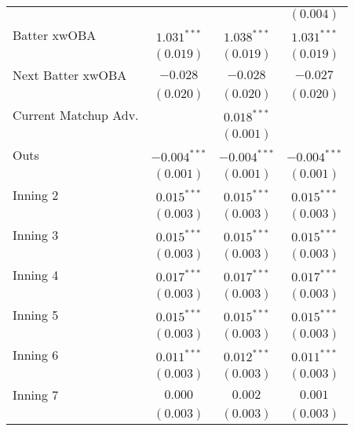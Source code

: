 \begin{table}
\begin{center}
\begin{tabular}{l c c c}
                               &                &                & $(0.004)$        \\
Batter xwOBA                   & $1.031^{***}$  & $1.038^{***}$  & $1.031^{***}$    \\
                               & $(0.019)$      & $(0.019)$      & $(0.019)$        \\
Next Batter xwOBA              & $-0.028$       & $-0.028$       & $-0.027$         \\
                               & $(0.020)$      & $(0.020)$      & $(0.020)$        \\
Current Matchup Adv.           &                & $0.018^{***}$  &                  \\
                               &                & $(0.001)$      &                  \\
Outs                           & $-0.004^{***}$ & $-0.004^{***}$ & $-0.004^{***}$   \\
                               & $(0.001)$      & $(0.001)$      & $(0.001)$        \\
Inning 2                       & $0.015^{***}$  & $0.015^{***}$  & $0.015^{***}$    \\
                               & $(0.003)$      & $(0.003)$      & $(0.003)$        \\
Inning 3                       & $0.015^{***}$  & $0.015^{***}$  & $0.015^{***}$    \\
                               & $(0.003)$      & $(0.003)$      & $(0.003)$        \\
Inning 4                       & $0.017^{***}$  & $0.017^{***}$  & $0.017^{***}$    \\
                               & $(0.003)$      & $(0.003)$      & $(0.003)$        \\
Inning 5                       & $0.015^{***}$  & $0.015^{***}$  & $0.015^{***}$    \\
                               & $(0.003)$      & $(0.003)$      & $(0.003)$        \\
Inning 6                       & $0.011^{***}$  & $0.012^{***}$  & $0.011^{***}$    \\
                               & $(0.003)$      & $(0.003)$      & $(0.003)$        \\
Inning 7                       & $0.000$        & $0.002$        & $0.001$          \\
                               & $(0.003)$      & $(0.003)$      & $(0.003)$        \\

\end{tabular}
\end{center}
\end{table}
